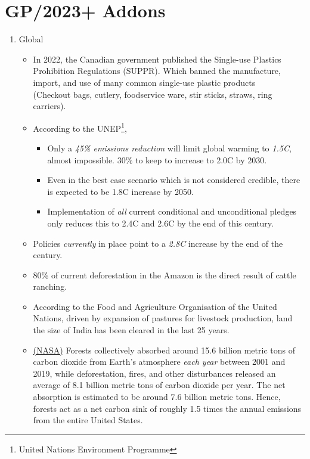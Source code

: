 \documentclass[oneside]{book}
\begin{document}
\section{GP/2023+ Addons}
    \begin{enumerate}
        \item Global
        \begin{itemize}
            \item In 2022, the Canadian government published the Single-use Plastics Prohibition Regulations (SUPPR). Which banned the manufacture, import, and use of many common single-use plastic products\\ 
            \footnotesize(Checkout bags, cutlery, foodservice ware, stir sticks, straws, ring carriers)\normalsize.  
            \item According to the UNEP\footnote{United Nations Environment Programme
            },
            \begin{itemize}
                \item Only a \emph{45\% emissions reduction} will limit global warming to \emph{1.5C}, almost impossible. 30\% to keep to increase to 2.0C by 2030.
                \item Even in the best case scenario which is not considered credible, there is expected to be 1.8C increase by 2050.
                \item Implementation of \emph{all} current conditional and unconditional pledges only reduces this to 2.4C and 2.6C by the end of this century.
            \end{itemize}
            \item Policies \emph{currently} in place point to a \emph{2.8C} increase by the end of the century.
            \item 80\% of current deforestation in the Amazon is the direct result of cattle ranching.
            \item According to the Food and Agriculture Organisation of the United Nations, driven by expansion of pastures for livestock production, land the size of India has been cleared in the last 25 years.
            \item \href{https://www.nasa.gov/science-research/earth-science/nasa-satellites-help-quantify-forests-impacts-on-global-carbon-budget/#:~:text=Forests%20around%20the%20world%20are,from%20the%20entire%20United%20States.}{(NASA)} Forests collectively absorbed around 15.6 billion metric tons of carbon dioxide from Earth's atmosphere \emph{each year} between 2001 and 2019, while deforestation, fires, and other disturbances released an average of 8.1 billion metric tons of carbon dioxide per year. The net absorption is estimated to be around 7.6 billion metric tons. Hence, forests act as a net carbon sink of roughly 1.5 times the annual emissions from the entire United States.

\end{itemize}
\end{enumerate}
\end{document}
